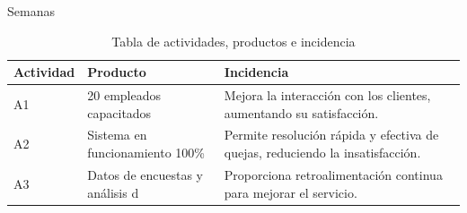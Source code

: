 \documentclass[24pt,aspectratio=169]{beamer}
\begin{document}
\begin{frame}{Semanas}
  \begin{table}[h!]
    \centering
    \begin{tabular}{|m{1cm}|m{5cm}|m{5cm}|}
      \hline
      \textbf{Actividad} & \textbf{Producto} & \textbf{Incidencia} \\
      \hline
      A1 & 20 empleados capacitados & Mejora la interacción con los clientes, aumentando su satisfacción. \\
      \hline
      A2 & Sistema en funcionamiento 100\% & Permite resolución rápida y efectiva de quejas, reduciendo la insatisfacción. \\
      \hline
      A3 & Datos de encuestas y análisis d & Proporciona retroalimentación continua para mejorar el servicio. \\
      \hline
    \end{tabular}
    \caption{Tabla de actividades, productos e incidencia}
    \label{tab:actividad_producto_incidencia}
  \end{table}
\end{frame}

\end{document}
